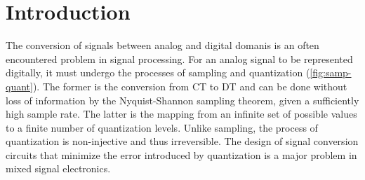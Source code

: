 
\chapter{Introduction}
\label{ch:Introduction}

The conversion of signals between analog and digital domanis is an often encountered problem in signal processing. For an analog signal to be represented digitally, it must undergo the processes of sampling and quantization (\autoref{fig:samp-quant}). The former is the conversion from \gls{CT} to \gls{DT} and can be done without loss of information by the Nyquist-Shannon sampling theorem, given a sufficiently high sample rate. The latter is the mapping from an infinite set of possible values to a finite number of quantization levels. Unlike sampling, the process of quantization is non-injective and thus irreversible. The design of signal conversion circuits that minimize the error introduced by quantization is a major problem in mixed signal electronics.

